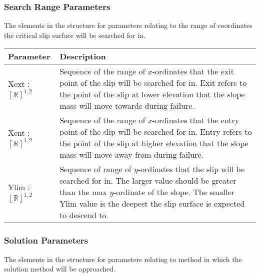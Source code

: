 \documentclass[12pt, titlepage]{article}
\begin{document}
\subsubsection{Search Range Parameters} \label{Tbl:SearchParam}
\noindent
The elements in the structure for parameters relating to the range of
coordinates the critical slip surface will be searched for in.

\begin{center}
\begin{tabular}{ p{}
    p{}}\hline 

  \textbf{Parameter} &
  \textbf{Description}\\ \hline

  Xext : $[\mathbb{R}]^{1,2}$ & Sequence of the range of $x$-ordinates
  that the exit point of the slip will be searched for in. Exit refers
  to the point of the slip at lower elevation that the slope mass will
  move towards during failure. \\

  Xent : $[\mathbb{R}]^{1,2}$ & Sequence of the range of $x$-ordinates
  that the entry point of the slip will be searched for in. Entry
  refers to the point of the slip at higher elevation that the slope
  mass will move away from during failure. \\

  Ylim : $[\mathbb{R}]^{1,2}$ & Sequence of range of $y$-ordinates
  that the slip will be searched for in. The larger value should be
  greater than the max $y$-ordinate of the slope. The smaller Ylim
  value is the deepest the slip surface is expected to descend
  to.\\ \hline
\end{tabular}
\end{center}

\subsubsection{Solution Parameters} \label{Tbl:SolnParam}
\noindent
The elements in the structure for parameters relating to method in
which the solution method will be approached.
\end{document}
